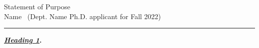 \documentclass[11pt]{article}
\newcommand{\soptitle}{Statement of Purpose}
\begin{document}
\vspace*{-3.5\baselineskip}
\thispagestyle{onlyfooter}
\begin{center}\LARGE\soptitle\\
\vspace{2pt}
\large Name \ (Dept. Name Ph.D. applicant for Fall 2022)
\end{center}

\vspace{3pt}
\hrule height 1pt





\textbf{\textit{\underline{Heading 1}}.} 




% 
\noindent


\end{document}
